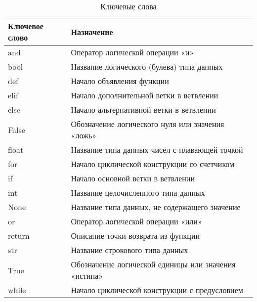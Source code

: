 \begin{table}[h]
    \centering
    \caption{Ключевые слова}
    \label{tab:python_keywords}
    \begin{tabular}{>{\ttfamily}l p{11cm}}
        \toprule
        \textrm{\normalfont Ключевое слово} & \textrm{\normalfont Назначение}                      \\
        \midrule
        and                                 & Оператор логической операции «и»                     \\
        bool                                & Название логического (булева) типа данных            \\
        def                                 & Начало объявления функции                            \\
        elif                                & Начало дополнительной ветки в ветвлении              \\
        else                                & Начало альтернативной ветки в ветвлении              \\
        False                               & Обозначение логического нуля или значения «ложь»     \\
        float                               & Название типа данных чисел с плавающей точкой        \\
        for                                 & Начало циклической конструкции со счетчиком          \\
        if                                  & Начало основной ветки в ветвлении                    \\
        int                                 & Название целочисленного типа данных                  \\
        None                                & Название типа данных, не содержащего значение        \\
        or                                  & Оператор логической операции «или»                   \\
        return                              & Описание точки возврата из функции                   \\
        str                                 & Название строкового типа данных                      \\
        True                                & Обозначение логической единицы или значения «истина» \\
        while                               & Начало циклической конструкции с предусловием        \\
        \bottomrule
    \end{tabular}
\end{table}


